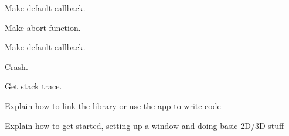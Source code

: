 
\begin{DoxyRefList}
\item[Global \mbox{\hyperlink{_crash_handler_8c_ab1ceb77327adca914ad64c2ab83148a7}{n\+Crash\+Handler\+Default}} (const int32\+\_\+t error, const char $\ast$error\+Desc, const int32\+\_\+t error\+Desc\+Len, const char $\ast$stack, const int32\+\_\+t stack\+Len, const time\+\_\+t error\+Time)]\label{todo__todo000001}%
%
Make default callback.  
\item[Global \mbox{\hyperlink{_crash_handler_8c_af9d107d452d67ebd418f4534ae31cab3}{n\+Crash\+Abort}} (const int32\+\_\+t error)]\label{todo__todo000002}%
%
Make abort function.  
\item[Global \mbox{\hyperlink{_errors_8c_a97d561d08d5d0201d37d1773e19c26e0}{n\+Error\+Handler\+Default}} (const int32\+\_\+t error, const char $\ast$error\+Desc, const int32\+\_\+t error\+Desc\+Len, const char $\ast$stack, const int32\+\_\+t stack\+Len, const time\+\_\+t error\+Time)]\label{todo__todo000003}%
%
Make default callback.  
\item[Global \mbox{\hyperlink{_errors_8c_a5c2568530315002dcbfccaafc5821883}{n\+Error\+To\+String}} (char $\ast$dst, int32\+\_\+t $\ast$size, const int32\+\_\+t error, const char $\ast$info, int32\+\_\+t info\+Len)]\label{todo__todo000004}%
%
Crash.  
\item[Global \mbox{\hyperlink{_errors_8c_a51c5b711f13bd8a6090936b7b2c21ecb}{n\+Error\+Get\+Stacktrace}} (char $\ast$dst, int32\+\_\+t $\ast$size, int32\+\_\+t $\ast$levels)]\label{todo__todo000005}%
%
Get stack trace.  
\item[page \mbox{\hyperlink{index}{Nimble Game Engine Library}} ]\label{todo__todo000006}%
%
Explain how to link the library or use the app to write code 

\label{todo__todo000007}%
%
Explain how to get started, setting up a window and doing basic 2D/3D stuff
\end{DoxyRefList}